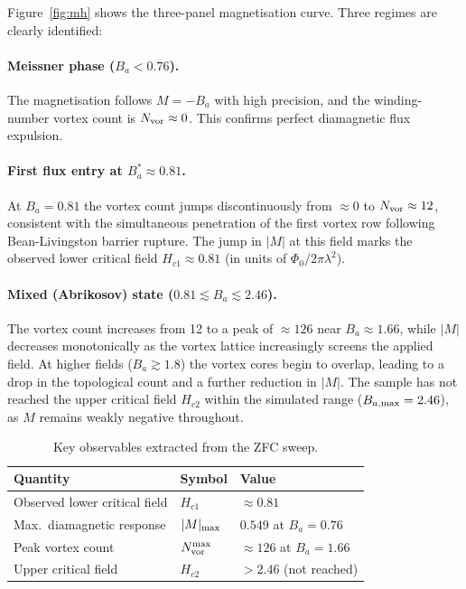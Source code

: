 \documentclass[11pt,a4paper]{article}
\newcommand{\Hcone}{H_{c1}}
\newcommand{\Hctwo}{H_{c2}}
\newcommand{\Ba}{B_a}
\newcommand{\lam}{\lambda}
\begin{document}
Figure~\ref{fig:mh} shows the three-panel magnetisation curve.
Three regimes are clearly identified:

\paragraph{Meissner phase ($\Ba < 0.76$).}
The magnetisation follows $M = -\Ba$ with high precision, and the
winding-number vortex count is $N_{\rm vor} \approx 0$.  This confirms
perfect diamagnetic flux expulsion.

\paragraph{First flux entry at $\Ba^* \approx 0.81$.}
At $\Ba = 0.81$ the vortex count jumps discontinuously from $\approx 0$ to
$N_{\rm vor} \approx 12$, consistent with the simultaneous penetration of
the first vortex row following Bean-Livingston barrier rupture.  The
jump in $|M|$ at this field marks the observed lower critical field
$\Hcone \approx 0.81$ (in units of $\Phi_0/2\pi\lam^2$).

\paragraph{Mixed (Abrikosov) state ($0.81 \lesssim \Ba \lesssim 2.46$).}
The vortex count increases from 12 to a peak of $\approx 126$ near
$\Ba \approx 1.66$, while $|M|$ decreases monotonically as the vortex
lattice increasingly screens the applied field.  At higher fields
($\Ba \gtrsim 1.8$) the vortex cores begin to overlap, leading to a drop
in the topological count and a further reduction in $|M|$.  The sample
has not reached the upper critical field $\Hctwo$ within the simulated
range ($B_{a,\rm max} = 2.46$), as $M$ remains weakly negative throughout.

\begin{table}[h!]
\centering
\caption{Key observables extracted from the ZFC sweep.}
\label{tab:obs}
\begin{tabular}{lll}
\toprule
Quantity & Symbol & Value \\
\midrule
Observed lower critical field & $\Hcone$ & $\approx 0.81$ \\
Max.\ diamagnetic response & $|M|_{\rm max}$ & $0.549$ at $\Ba = 0.76$ \\
Peak vortex count & $N_{\rm vor}^{\rm max}$ & $\approx 126$ at $\Ba = 1.66$ \\
Upper critical field & $\Hctwo$ & $> 2.46$ (not reached) \\
\bottomrule
\end{tabular}
\end{table}
\end{document}
